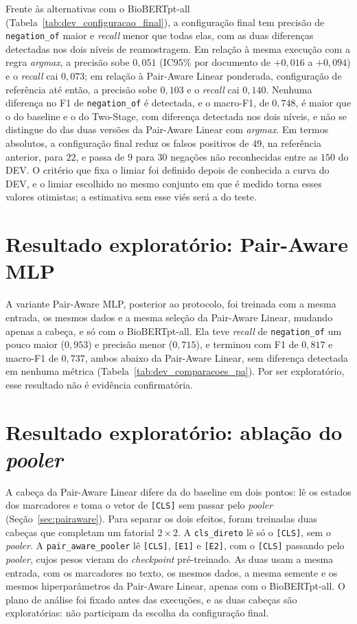 Frente às alternativas com o BioBERTpt-all
(Tabela~\ref{tab:dev_configuracao_final}), a configuração final tem precisão de
\texttt{negation\_of} maior e \emph{recall} menor que todas elas, com as duas
diferenças detectadas nos dois níveis de reamostragem. Em relação à mesma execução
com a regra \emph{argmax}, a precisão sobe $0{,}051$ (IC95\% por documento de
$+0{,}016$ a $+0{,}094$) e o \emph{recall} cai $0{,}073$; em relação à Pair-Aware
Linear ponderada, configuração de referência até então, a precisão sobe $0{,}103$ e
o \emph{recall} cai $0{,}140$. Nenhuma diferença no F1 de \texttt{negation\_of} é
detectada, e o macro-F1, de $0{,}748$, é maior que o do baseline e o do Two-Stage,
com diferença detectada nos dois níveis, e não se distingue do das duas versões da
Pair-Aware Linear com \emph{argmax}. Em termos absolutos, a configuração final
reduz os falsos positivos de $49$, na referência anterior, para $22$, e passa de $9$
para $30$ negações não reconhecidas entre as $150$ do DEV. O critério que fixa o
limiar foi definido depois de conhecida a curva do DEV, e o limiar escolhido no
mesmo conjunto em que é medido torna esses valores otimistas; a estimativa sem esse
viés será a do teste.



\section{Resultado exploratório: Pair-Aware MLP}
\label{sec:resultados_exploratorios}

A variante Pair-Aware MLP, posterior ao protocolo, foi treinada com a mesma entrada, os
mesmos dados e a mesma seleção da Pair-Aware Linear, mudando apenas a cabeça, e só com
o BioBERTpt-all. Ela teve \emph{recall} de \texttt{negation\_of} um pouco maior
($0{,}953$) e precisão menor ($0{,}715$), e terminou com F1 de $0{,}817$ e macro-F1 de
$0{,}737$, ambos abaixo da Pair-Aware Linear, sem diferença detectada em nenhuma
métrica (Tabela~\ref{tab:dev_comparacoes_pa}). Por ser exploratório, esse resultado
não é evidência confirmatória.

\section{Resultado exploratório: ablação do \emph{pooler}}
\label{sec:resultados_ablacao}

A cabeça da Pair-Aware Linear difere da do baseline em dois pontos: lê os estados
dos marcadores e toma o vetor de \texttt{[CLS]} sem passar pelo \emph{pooler}
(Seção~\ref{sec:pairaware}). Para separar os dois efeitos, foram treinadas duas
cabeças que completam um fatorial $2 \times 2$. A \texttt{cls\_direto} lê só o
\texttt{[CLS]}, sem o \emph{pooler}. A \texttt{pair\_aware\_pooler} lê
\texttt{[CLS]}, \texttt{[E1]} e \texttt{[E2]}, com o \texttt{[CLS]} passando pelo
\emph{pooler}, cujos pesos vieram do \emph{checkpoint} pré-treinado. As duas usam a
mesma entrada, com os marcadores no texto, os mesmos dados, a mesma semente e os
mesmos hiperparâmetros da Pair-Aware Linear, apenas com o BioBERTpt-all. O plano de
análise foi fixado antes das execuções, e as duas cabeças são exploratórias: não
participam da escolha da configuração final.

